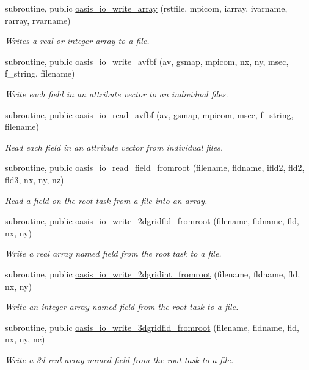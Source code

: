 \begin{DoxyCompactItemize}
subroutine, public \hyperlink{classmod__oasis__io_a9ac8ce0ba3223fb59f7f003b50b229cf}{oasis\+\_\+io\+\_\+write\+\_\+array} (rstfile, mpicom, iarray, ivarname, rarray, rvarname)
\begin{DoxyCompactList}\small\item\em Writes a real or integer array to a file. \end{DoxyCompactList}\item 
subroutine, public \hyperlink{classmod__oasis__io_a42b325557a774b08d4cba24f387f8b01}{oasis\+\_\+io\+\_\+write\+\_\+avfbf} (av, gsmap, mpicom, nx, ny, msec, f\+\_\+string, filename)
\begin{DoxyCompactList}\small\item\em Write each field in an attribute vector to an individual files. \end{DoxyCompactList}\item 
subroutine, public \hyperlink{classmod__oasis__io_ac4a465a698824fb473074bfbd3d92f79}{oasis\+\_\+io\+\_\+read\+\_\+avfbf} (av, gsmap, mpicom, msec, f\+\_\+string, filename)
\begin{DoxyCompactList}\small\item\em Read each field in an attribute vector from individual files. \end{DoxyCompactList}\item 
subroutine, public \hyperlink{classmod__oasis__io_af080505b4678a5c68916a700f54ac6e6}{oasis\+\_\+io\+\_\+read\+\_\+field\+\_\+fromroot} (filename, fldname, ifld2, fld2, fld3, nx, ny, nz)
\begin{DoxyCompactList}\small\item\em Read a field on the root task from a file into an array. \end{DoxyCompactList}\item 
subroutine, public \hyperlink{classmod__oasis__io_a18912324646473cf8fedd7138cc59a79}{oasis\+\_\+io\+\_\+write\+\_\+2dgridfld\+\_\+fromroot} (filename, fldname, fld, nx, ny)
\begin{DoxyCompactList}\small\item\em Write a real array named field from the root task to a file. \end{DoxyCompactList}\item 
subroutine, public \hyperlink{classmod__oasis__io_a432ecb26e0e2d8387c1601ea6cc68668}{oasis\+\_\+io\+\_\+write\+\_\+2dgridint\+\_\+fromroot} (filename, fldname, fld, nx, ny)
\begin{DoxyCompactList}\small\item\em Write an integer array named field from the root task to a file. \end{DoxyCompactList}\item 
subroutine, public \hyperlink{classmod__oasis__io_aa967e930e5d6199bbc6ec9a4f3c7069e}{oasis\+\_\+io\+\_\+write\+\_\+3dgridfld\+\_\+fromroot} (filename, fldname, fld, nx, ny, nc)
\begin{DoxyCompactList}\small\item\em Write a 3d real array named field from the root task to a file. \end{DoxyCompactList}\end{DoxyCompactItemize}


